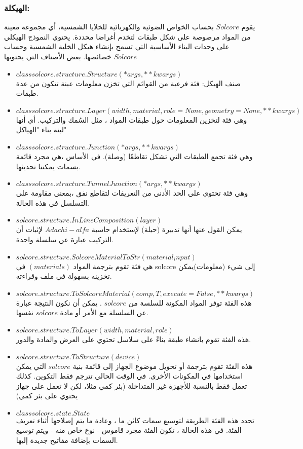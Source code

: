 \subsubsection{الهيكلة:}
يقوم $ Solcore $ بحساب الخواص الضوئية والكهربائية للخلايا الشمسية، أي مجموعة معينة من المواد مرصوصة على شكل طبقات لتخدم أغراضا محددة. يحتوي النموذج الهيكلي على وحدات البناء الأساسية التي تسمح بإنشاء هيكل الخلية الشمسية وحساب خصائصها.
بعض الأصناف التي يحتويها $ Solcore $ 
\begin{itemize}
	\item $ class solcore.structure.Structure(*args, **kwargs) $
	\\ صنف الهيكل: فئة فرعية من القوائم التي تخزن معلومات عينة تتكون من عدة طبقات.
	\item $ class solcore.structure.Layer(width, material, role=None, geometry=None, **kwargs) $
	\\وهي فئة لتخزين المعلومات حول طبقات المواد ، مثل السُمك والتركيب. أي أنها لبنة بناء "الهياكل"
	\item $ class solcore.structure.Junction(*args, **kwargs) $
	\\وهي فئة تجمع الطبقات التي تشكل تقاطعًا (وصلة). في الأساس ،هي مجرد قائمة بسمات يمكننا تحديثها.
	\item $ class solcore.structure.TunnelJunction(*args, **kwargs) $
	\\وهي فئة تحتوي على الحد الأدنى من التعريفات لتقاطع نفق ،بمعنى مقاومة على التسلسل في هذه الحالة.
	\item $ solcore.structure.InLineComposition(layer) $
	\\يمكن القول عنها أنها تدبيرة (حيلة) لإستخدام حاسبة $ Adachi-alfa $ لإثبات أن التركيب عبارة عن سلسلة واحدة.
	\item $ solcore.structure.SolcoreMaterialToStr(material_input) $
	\\هي فئة تقوم بترجمة المواد $ (materials) $ في solcore إلى شيء (معلومات)يمكن تخزينه بسهولة في ملف وقراءته.
	\item $ solcore.structure.ToSolcoreMaterial(comp, T, execute=False, **kwargs) $
	\\هذه الفئة توفر المواد المكونة للسلسة من $ solcore $ . يمكن أن نكون النتيجة عبارة عن السلسلة مع الأمر أو مادة $ solcore $ نفسها.
	\item $ solcore.structure.ToLayer(width, material, role) $
	\\هذه الفئة تقوم بانشاء طبقة بناءً على سلاسل تحتوي على العرض والمادة والدور.
	\item $ solcore.structure.ToStructure(device) $
	\\هذه الفئة تقوم بترجمة أو تحويل موضوع الجهاز إلى قائمة بنية $ solcore $ التي يمكن استخدامها في المكونات الأخرى. في الوقت الحالي تترجم فقط التكوين. كذلك تعمل فقط بالنسبة للأجهزة غير المتداخلة (بئر كمي مثلا، لكن لا تعمل على جهاز يحتوي على بئر كمي)
	\item $ class solcore.state.State $
	\\تحدد هذه الفئة الطريقة لتوسيع سمات كائن ما ، وعادة ما يتم إصلاحها أثناء تعريف الفئة. في هذه الحالة ، تكون الفئة مجرد قاموس - نوع خاص منه - ويتم توسيع السمات بإضافة مفاتيح جديدة إليها.
\end{itemize} 
